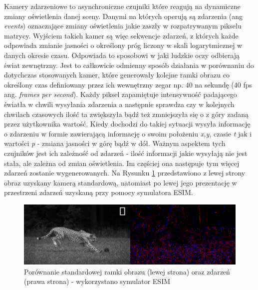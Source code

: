     Kamery zdarzeniowe to asynchroniczne czujniki które reagują na dynamiczne zmiany oświetlenia danej sceny. Danymi na których operują są zdarzenia (ang \emph{events}) oznaczające zmiany oświetlenia jakie zaszły w rozpatrywanym pikselu matrycy. Wyjściem takich kamer są więc sekwencje zdarzeń, z których każde odpowiada zmianie jasności o określony próg liczony w skali logarytmicznej w danych okresie czasu. Odpowiada to sposobowi w jaki ludzkie oczy odbierają świat zewnętrzny. Jest to całkowicie odmienny sposób działania w porównaniu do dotychczas stosowanych kamer, które generowały kolejne ramki obrazu co określony czas definiowany przez ich wewnętrzny zegar np. 40 na sekundę (40 fps ang. \emph{frames per second}).
    Każdy piksel zapamiętuje intensywność padającego światła w chwili wysyłania zdarzenia a następnie sprawdza czy w kolejnych chwilach czasowych ilość ta zwiększyła bądź też zmniejszyła się o z góry zadaną przez użytkownika wartość. Kiedy dochodzi do takiej sytuacji wysyła informację o zdarzeniu w formie zawierającą informację o swoim położeniu \emph{x,y}, czasie \emph{t} jak i wartości \emph{p} - zmiana jasności w górę bądź w dół. Ważnym aspektem tych czujników jest ich zależność od zdarzeń - ilość informacji jakie wysyłają nie jest stała, ale zależna od zmian oświetlenia. Im częściej ona następuje tym więcej zdarzeń zostanie wygenerowanych. Na Rysunku \ref{fig:events} przedstawiono z lewej strony obraz uzyskany kamerą standardową, natomiast po lewej jego prezentację w przestrzeni zdarzeń uzyskaną przy pomocy symulatora ESIM.\\
    
    \begin{figure}[h]
        \centering
        \includegraphics[width=\textwidth]{Codes/ESIM_test/screenshot2.png}
        \caption{Porównanie standardowej ramki obrazu (lewej strona) oraz zdarzeń (prawa strona) - wykorzystano symulator ESIM}
        \label{fig:events}
    \end{figure}
        
